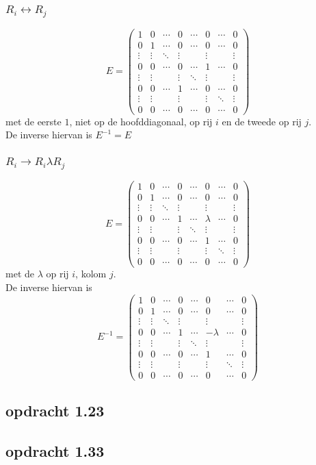 \documentclass[10pt,a4paper]{article}
\begin{document}
\subsubsection*{$R_i \leftrightarrow R_j$}
\[
E=
\begin{pmatrix}
1 & 0 & \cdots & 0 & \cdots & 0 & \cdots & 0\\
0 & 1 & \cdots & 0 & \cdots & 0 & \cdots & 0\\
\vdots & \vdots & \ddots & \vdots& & \vdots & &\vdots\\
0 & 0 & \cdots & 0 & \cdots & 1 & \cdots & 0\\
\vdots & \vdots & & \vdots& \ddots & \vdots & &\vdots\\
0 & 0 & \cdots & 1 & \cdots & 0 & \cdots & 0\\
\vdots & \vdots & & \vdots & & \vdots & \ddots & \vdots\\
0 & 0 & \cdots & 0 & \cdots & 0 & \cdots & 0
\end{pmatrix}
\]
met de eerste $1$, niet op de hoofddiagonaal, op rij $i$ en de tweede op rij $j$.\\
De inverse hiervan is $E^{-1} = E$

\subsubsection*{$R_i \rightarrow R_i \lambda R_j$}
\[
E=
\begin{pmatrix}
1 & 0 & \cdots & 0 & \cdots & 0 & \cdots & 0\\
0 & 1 & \cdots & 0 & \cdots & 0 & \cdots & 0\\
\vdots & \vdots & \ddots & \vdots& & \vdots & &\vdots\\
0 & 0 & \cdots & 1 & \cdots & \lambda & \cdots & 0\\
\vdots & \vdots & & \vdots& \ddots & \vdots & &\vdots\\
0 & 0 & \cdots & 0 & \cdots & 1 & \cdots & 0\\
\vdots & \vdots & & \vdots & & \vdots & \ddots & \vdots\\
0 & 0 & \cdots & 0 & \cdots & 0 & \cdots & 0
\end{pmatrix}
\]
met de $\lambda$ op rij $i$, kolom $j$.\\
De inverse hiervan is 
\[
E^{-1}=
\begin{pmatrix}
1 & 0 & \cdots & 0 & \cdots & 0 & \cdots & 0\\
0 & 1 & \cdots & 0 & \cdots & 0 & \cdots & 0\\
\vdots & \vdots & \ddots & \vdots& & \vdots & &\vdots\\
0 & 0 & \cdots & 1 & \cdots & -\lambda & \cdots & 0\\
\vdots & \vdots & & \vdots& \ddots & \vdots & &\vdots\\
0 & 0 & \cdots & 0 & \cdots & 1 & \cdots & 0\\
\vdots & \vdots & & \vdots & & \vdots & \ddots & \vdots\\
0 & 0 & \cdots & 0 & \cdots & 0 & \cdots & 0
\end{pmatrix}
\]

\subsection*{opdracht 1.23}

\subsection*{opdracht 1.33}
\end{document}
